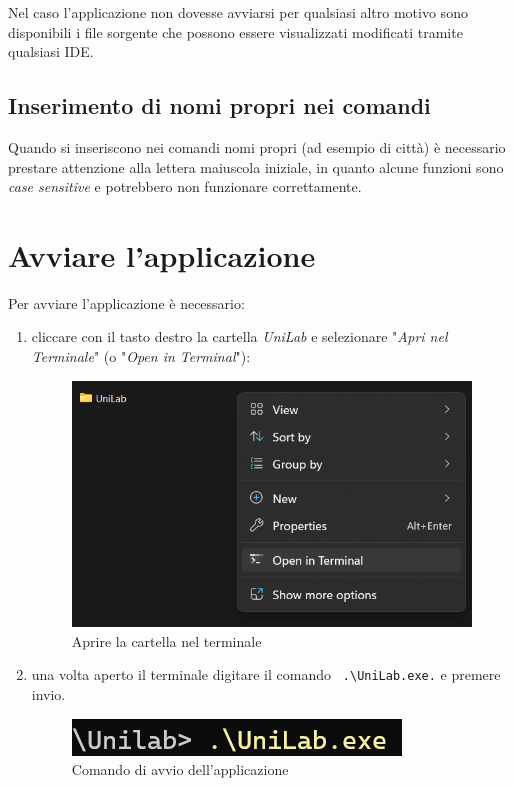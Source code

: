 \documentclass[12pt]{scrreprt}
\begin{document}
		Nel caso l'applicazione non dovesse avviarsi per qualsiasi altro motivo sono disponibili i file sorgente che possono essere visualizzati modificati tramite qualsiasi IDE.
		
		\subsection{Inserimento di nomi propri nei comandi}
		Quando si inseriscono nei comandi nomi propri (ad esempio di citt\`a) \`e necessario prestare attenzione alla lettera maiuscola iniziale, in quanto alcune funzioni sono \textsl{case sensitive} e potrebbero non funzionare correttamente.
	
	\section{Avviare l'applicazione}
	
	Per avviare l'applicazione \`e necessario:
	\begin{enumerate}
		\item cliccare con il tasto destro la cartella \textsl{UniLab} e selezionare "\textsl{Apri nel Terminale}" (o "\textsl{Open in Terminal}"):
		\begin{figure}[H]
			\centering
			\includegraphics[width=0.7\linewidth]{Screen/aprinelterminale}
			\caption{Aprire la cartella nel terminale}
			\label{fig:aprinelterminale}
		\end{figure}
		\item una volta aperto il terminale digitare il comando
		\verb! .\UniLab.exe.! e premere invio.
		\begin{figure}[H]
			\centering
			\includegraphics[width=0.3\linewidth]{Screen/avviocom}
			\caption{Comando di avvio dell'applicazione}
			\label{fig:avviocom}
		\end{figure}
	\end{enumerate}
	
\end{document}
